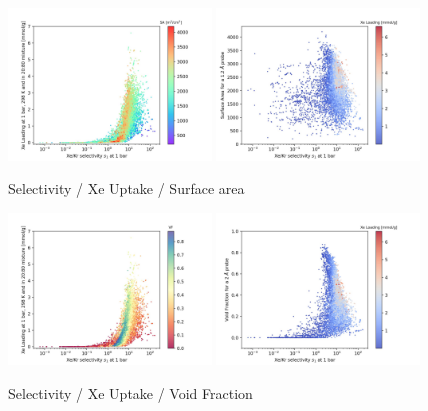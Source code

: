\documentclass[main.tex]{subfiles}
\begin{document}
\begin{figure}[ht]
  \centering
  \includegraphics[width=0.48\textwidth]{figures/2-thermo/Scatterplot_uptake_selectivity_sa.jpg}
  \includegraphics[width=0.48\textwidth]{figures/2-thermo/Scatterplot_sa_selectivity.jpg}
  \caption{Selectivity / Xe Uptake / Surface area}
\end{figure}

\begin{figure}[ht]
  \centering
  \includegraphics[width=0.48\textwidth]{figures/2-thermo/Scatterplot_uptake_selectivity_vol.jpg}
  \includegraphics[width=0.48\textwidth]{figures/2-thermo/Scatterplot_vol_selectivity.jpg}
  \caption{Selectivity / Xe Uptake / Void Fraction}
\end{figure}
\end{document}
